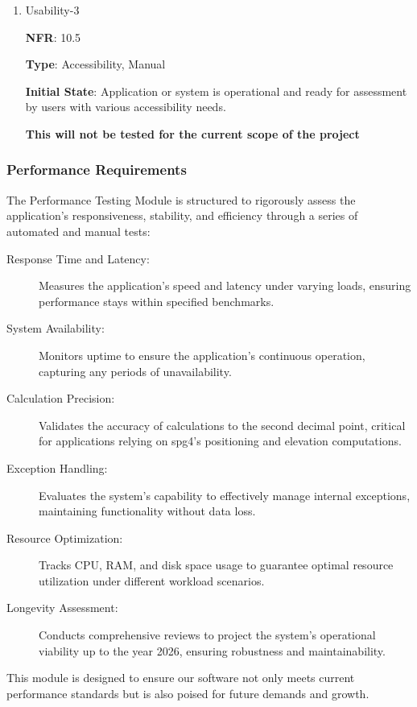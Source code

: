 \documentclass[12pt, titlepage]{article}
\begin{document}
\begin{enumerate}
\item{Usability-3\\}

\textbf{NFR}: 10.5

\textbf{Type}: Accessibility, Manual

\textbf{Initial State}: Application or system is operational and ready for assessment by users with various accessibility needs.

\textbf{This will not be tested for the current scope of the project}

\end{enumerate}

\subsubsection{Performance Requirements}

The Performance Testing Module is structured to rigorously assess the application's responsiveness, stability, and efficiency through a series of automated and manual tests:

\begin{description}
    \item[Response Time and Latency:] Measures the application's speed and latency under varying loads, ensuring performance stays within specified benchmarks.
    \item[System Availability:] Monitors uptime to ensure the application's continuous operation, capturing any periods of unavailability.
    \item[Calculation Precision:] Validates the accuracy of calculations to the second decimal point, critical for applications relying on spg4's positioning and elevation computations.
    \item[Exception Handling:] Evaluates the system's capability to effectively manage internal exceptions, maintaining functionality without data loss.
    \item[Resource Optimization:] Tracks CPU, RAM, and disk space usage to guarantee optimal resource utilization under different workload scenarios.
    \item[Longevity Assessment:] Conducts comprehensive reviews to project the system's operational viability up to the year 2026, ensuring robustness and maintainability.
\end{description}

This module is designed to ensure our software not only meets current performance standards but is also poised for future demands and growth.
\end{document}
